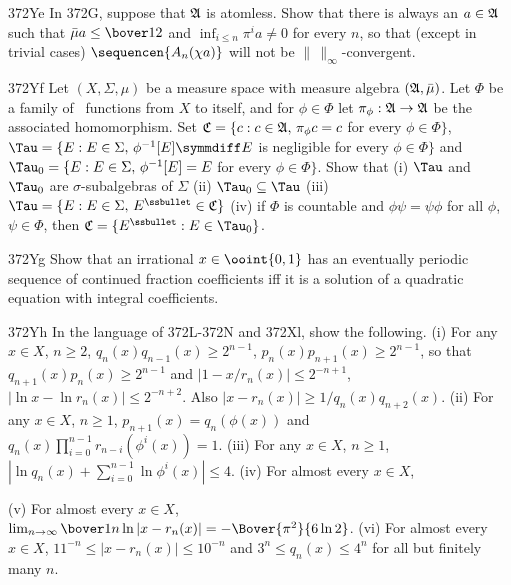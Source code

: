 {\spheader 372Ye In 372G, suppose that $\frak A$ is atomless.   Show that
there is always an $a\in\frak A$ such that $\bar\mu a\le\bover12$ and
$\inf_{i\le n}\pi^ia\ne 0$ for every $n$, so that (except in trivial
cases) $\sequencen{A_n(\chi a)}$ will not be
$\|\,\|_{\infty}$-convergent.

\spheader 372Yf Let $(X,\Sigma,\mu)$ be a measure space with
measure algebra $(\frak A,\bar\mu)$.   Let $\Phi$ be a family of \imp\
functions from $X$ to itself, and for $\phi\in\Phi$ let
$\pi_{\phi}:\frak A\to\frak A$ be the associated
homomorphism.   Set
$\frak C=\{c:c\in\frak A,\,\pi_{\phi}c=c$ for every $\phi\in\Phi\}$,
$\Tau=\{E:E\in\Sigma,\,\phi^{-1}[E]\symmdiff E$ is negligible for every
$\phi\in\Phi\}$ and
$\Tau_0=\{E:E\in\Sigma,\,\phi^{-1}[E]=E$ for every $\phi\in\Phi\}$.
Show that (i) $\Tau$ and $\Tau_0$
are $\sigma$-subalgebras of $\Sigma$ (ii) $\Tau_0\subseteq\Tau$ (iii)
$\Tau=\{E:E\in\Sigma,\,E^{\ssbullet}\in\frak C\}$ (iv) if $\Phi$ is
countable and $\phi\psi=\psi\phi$ for all $\phi$, $\psi\in\Phi$, then
$\frak C=\{E^{\ssbullet}:E\in\Tau_0\}$.

\spheader 372Yg  Show that an irrational $x\in\ooint{0,1}$ has an
eventually periodic sequence of continued fraction coefficients iff it
is a solution of a quadratic equation with integral coefficients.

\spheader 372Yh In the language of 372L-372N and 372Xl, show the
following.   (i) For any $x\in X$, $n\ge 2$,
$q_n(x)q_{n-1}(x)\ge 2^{n-1}$, $p_{n}(x)p_{n+1}(x)\ge 2^{n-1}$, so that
$q_{n+1}(x)p_{n}(x)\ge 2^{n-1}$ and $|1-x/r_n(x)|\le 2^{-n+1}$,
$|\ln x-\ln r_n(x)|\le 2^{-n+2}$.   Also $|x-r_n(x)|\ge
1/q_n(x)q_{n+2}(x)$.   (ii) For any $x\in X$, $n\ge 1$,
$p_{n+1}(x)=q_n(\phi(x))$ and
$q_n(x)\prod_{i=0}^{n-1}r_{n-i}(\phi^{i}(x))=1$.   (iii) For any
$x\in X$, $n\ge 1$, $|\ln q_n(x)+\sum_{i=0}^{n-1}\ln\phi^i(x)|\le 4$.
(iv) For almost every $x\in X$,


\noindent {}  (v) For almost every $x\in X$,
$\lim_{n\to\infty}\bover1n\ln|x-r_n(x)|=-\Bover{\pi^2}{6\ln 2}$.
(vi) For almost every $x\in X$, $11^{-n}\le|x-r_n(x)|\le 10^{-n}$ and
$3^n\le q_n(x)\le 4^n$ for all but finitely many $n$.

}
